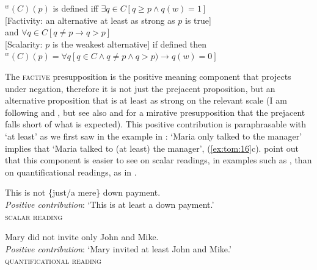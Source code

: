\documentclass[output=paper,colorlinks,citecolor=brown]{langscibook}
\begin{document}
\ea\label{ex:tom:75}
$^w(C)(p)$ is defined iff
\ea $\exists q\in C [q\geq p\wedge q(w) = 1]$\label{ex:tom:75a}\\
{[Factivity: an alternative at least as strong as $p$ is true]}\smallskip\\
and
\ex ${\forall} q\in C [q\neq p → q > p]$\label{ex:tom:75b}\\
{[Scalarity: $p$ is the weakest alternative]}\smallskip
\z
if defined then\\
$^w(C)(p)= \forall q[q\in C\wedge q\neq p\wedge q > p) → q (w) = 0]$ 
\z

The \textsc{factive} presupposition is the positive meaning component that projects under negation, therefore it is not just the prejacent proposition, but an alternative proposition that is at least as strong on the relevant scale (I am following \citealt{klinedinst05} and \citealt{coppockbeaver14}, but see also \citealt{beaverclark08} and \citealt{zeevat09} for a mirative presupposition that the prejacent falls short of what is expected). This positive contribution is paraphrasable with `at least' as we first saw in the example in : `Maria only talked to the manager' implies that `Maria talked to (at least) the manager', (\ref{ex:tom:16}c). \citet{coppockbeaver14} point out that this component is easier to see on scalar readings, in examples such as , than on quantificational readings, as in .

\ea\label{ex:tom:coppockbeaver14a}
This is not \{just/a mere\} down payment.\smallskip\\
\textit{Positive contribution}:
`This is at least a down payment.'\\\hfill \textsc{scalar reading} \cite[(8--9) p. 374]{coppockbeaver14} 
\z

\ea\label{ex:tom:coppockbeaver14b}  
Mary did not invite only John and Mike. \smallskip\\
\textit{Positive contribution}:
`Mary invited at least John and Mike.'\\\hfill \textsc{quantificational reading} \cite[(18) p. 379]{coppockbeaver14}
\z
\end{document}
